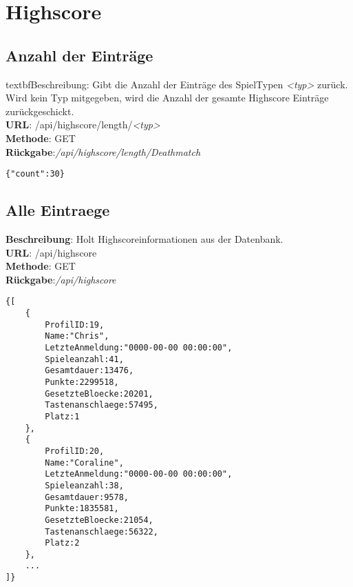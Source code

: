 \documentclass[11pt,a4paper]{article} %
\begin{document}
\section*{Highscore}

\subsection*{Anzahl der Einträge}
textbf{Beschreibung}: Gibt die Anzahl der Einträge des SpielTypen \textit{<typ>} zurück. Wird kein Typ mitgegeben, wird die Anzahl der gesamte Highscore Einträge zurückgeschickt.\\
\textbf{URL}: /api/highscore/length/\textit{<typ>}\\
\textbf{Methode}: GET\\
\textbf{Rückgabe}:\textcolor{kommi}{\textit{/api/highscore/length/Deathmatch}}\\
\begin{lstlisting}
{"count":30}
\end{lstlisting}

\subsection*{Alle Eintraege}
\textbf{Beschreibung}: Holt Highscoreinformationen aus der Datenbank.\\
\textbf{URL}: /api/highscore\\
\textbf{Methode}: GET\\
\textbf{Rückgabe}:\textcolor{kommi}{\textit{/api/highscore}}\\
\begin{lstlisting}
{[
	{
		ProfilID:19,
		Name:"Chris",
		LetzteAnmeldung:"0000-00-00 00:00:00",
		Spieleanzahl:41,
		Gesamtdauer:13476,
		Punkte:2299518,
		GesetzteBloecke:20201,
		Tastenanschlaege:57495,
		Platz:1
	},
	{
		ProfilID:20,
		Name:"Coraline",
		LetzteAnmeldung:"0000-00-00 00:00:00",
		Spieleanzahl:38,
		Gesamtdauer:9578,
		Punkte:1835581,
		GesetzteBloecke:21054,
		Tastenanschlaege:56322,
		Platz:2
	},
	...
]}
\end{lstlisting}

\end{document}
